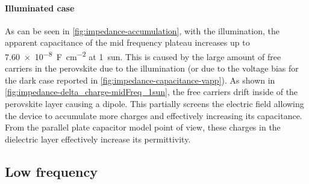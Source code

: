 
		\paragraph{Illuminated case}
		As can be seen in \cref{fig:impedance-accumulation}, with the illumination, the apparent capacitance of the mid frequency plateau increases up to \SI{7.60e-8}{\farad\per\square\cm} at \SI{1}{sun}.
		This is caused by the large amount of free carriers in the perovskite due to the illumination (or due to the voltage bias for the dark case reported in \cref{fig:impedance-capacitance-vapp}).
		As shown in \cref{fig:impedance-delta_charge-midFreq_1sun}, the free carriers drift inside of the perovskite layer causing a dipole.
		This partially screens the electric field allowing the device to accumulate more charges and effectively increasing its capacitance.
		From the parallel plate capacitor model point of view, these charges in the dielectric layer effectively increase its permittivity.

	\begin{figure}%
	\end{figure}



	\subsection{Low frequency}
	
